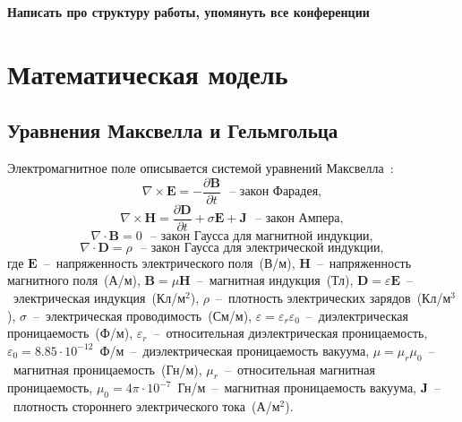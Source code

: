 \documentclass[a4paper,14pt]{article}
\begin{document}
{\color{red}\textbf{Написать про структуру работы, упомянуть все конференции}}


\clearpage
\section{Математическая модель}
\subsection{Уравнения Максвелла и Гельмгольца}
Электромагнитное поле описывается системой уравнений Максвелла~\citep{epov}:
\begin{equation}
	\nabla \times \mathbf{E} = - \frac{ \partial \mathbf{B} }{ \partial t } \text{~~--~закон Фарадея}, \label{eq:maxwell:faradey}
\end{equation}
\begin{equation}
	\nabla \times \mathbf{H} = \frac{ \partial \mathbf{D} }{ \partial t } + \sigma \mathbf{E} + \mathbf{J} \text{~~--~закон Ампера}, \label{eq:maxwell:amper}
\end{equation}
\begin{equation*}
	\nabla \cdot \mathbf{B} = 0 \text{~~--~закон Гаусса для магнитной индукции}, \label{eq:maxwell:gauss_magn}
\end{equation*}
\begin{equation*}
	\nabla \cdot \mathbf{D} = \rho \text{~~--~закон Гаусса для электрической индукции}, \label{eq:maxwell:gauss_elect}
\end{equation*}
где $\mathbf{E}$~--~напряженность электрического поля~(В/м), $\mathbf{H}$~--~напряженность магнитного поля~(А/м), $\mathbf{B}=\mu \mathbf{H}$~--~магнитная индукция~(Тл), $\mathbf{D}=\varepsilon \mathbf{E}$~--~электрическая индукция~(Кл/м${}^2$), $\rho$~--~плотность электрических зарядов~(Кл/м${}^3$), $\sigma$~--~электрическая проводимость~(См/м), $\varepsilon = \varepsilon_r \varepsilon_0$~--~диэлектрическая проницаемость~(Ф/м), $\varepsilon_r$~--~относительная диэлектрическая проницаемость, $\varepsilon_0 = 8.85 \cdot 10^{-12}$~Ф/м~--~диэлектрическая проницаемость вакуума, $\mu = \mu_r \mu_0$~--~магнитная проницаемость~(Гн/м), $\mu_r$~--~относительная магнитная проницаемость, $\mu_0 = 4 \pi \cdot 10^{-7}$~Гн/м~--~магнитная проницаемость вакуума, $\mathbf{J}$~--~плотность стороннего электрического тока~(А/м${}^2$).
\end{document}
